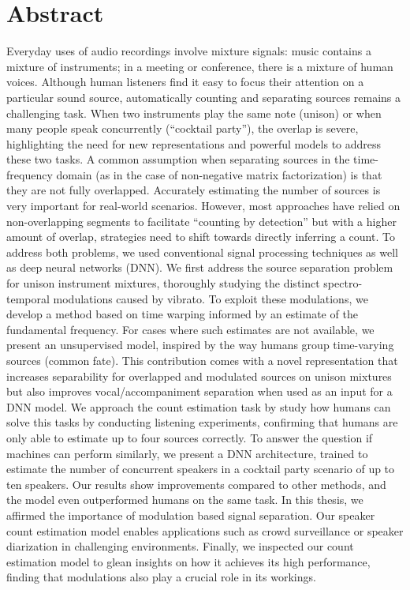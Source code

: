 \begingroup
\let\clearpage\relax
\let\cleardoublepage\relax
\let\cleardoublepage\relax

\chapter*{Abstract}
Everyday uses of audio recordings involve mixture signals: music contains a mixture of instruments; in a meeting or conference, there is a mixture of human voices.
Although human listeners find it easy to focus their attention on a particular sound source, automatically counting and separating sources remains a challenging task.
When two instruments play the same note (unison) or when many people speak concurrently (``cocktail party''), the overlap is severe, highlighting the need for new representations and powerful models to address these two tasks.
A common assumption when separating sources in the time-frequency domain (as in the case of non-negative matrix factorization) is that they are not fully overlapped.
Accurately estimating the number of sources is very important for real-world scenarios.
However, most approaches have relied on non-overlapping segments to facilitate ``counting by detection'' but with a higher amount of overlap, strategies need to shift towards directly inferring a count.
To address both problems, we used conventional signal processing techniques as well as deep neural networks (DNN).
We first address the source separation problem for unison instrument mixtures, 
thoroughly studying the distinct spectro-temporal modulations caused by vibrato. 
To exploit these modulations, we develop a method based on time warping informed by an estimate of the fundamental frequency. 
For cases where such estimates are not available, we present an unsupervised model, inspired by the way humans group time-varying sources (common fate).
This contribution comes with a novel representation that increases separability for overlapped and modulated sources on unison mixtures but also improves vocal/accompaniment separation when used as an input for a DNN model.
We approach the count estimation task by study how humans can solve this tasks by conducting listening experiments, confirming that humans are only able to estimate up to four sources correctly.
To answer the question if machines can perform similarly, we present a DNN architecture, trained to estimate the number of concurrent speakers in a cocktail party scenario of up to ten speakers.
Our results show improvements compared to other methods, and the model even outperformed humans on the same task.
In this thesis, we affirmed the importance of modulation based signal separation. 
Our speaker count estimation model enables applications such as crowd surveillance or speaker diarization in challenging environments.
Finally, we inspected our count estimation model to glean insights on how it achieves its high performance, finding that modulations also play a crucial role in its workings.

